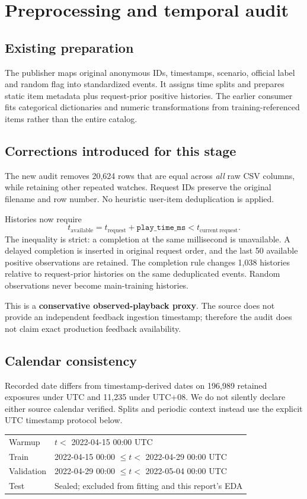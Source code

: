 \documentclass[11pt,a4paper]{article}
\begin{document}
\section{Preprocessing and temporal audit}
\subsection{Existing preparation}
The publisher maps original anonymous IDs, timestamps, scenario, official label and random flag into standardized events. It assigns time splits and prepares static item metadata plus request-prior positive histories. The earlier consumer fits categorical dictionaries and numeric transformations from training-referenced items rather than the entire catalog.

\subsection{Corrections introduced for this stage}
The new audit removes 20,624 rows that are equal across \emph{all} raw CSV columns, while retaining other repeated watches. Request IDs preserve the original filename and row number. No heuristic user-item deduplication is applied.

Histories now require
\[t_{\mathrm{available}}=t_{\mathrm{request}}+\texttt{play\_time\_ms}
<t_{\mathrm{current\ request}}.\]
The inequality is strict: a completion at the same millisecond is unavailable. A delayed completion is inserted in original request order, and the last 50 available positive observations are retained. The completion rule changes 1,038 histories relative to request-prior histories on the same deduplicated events. Random observations never become main-training histories.

This is a \textbf{conservative observed-playback proxy}. The source does not provide an independent feedback ingestion timestamp; therefore the audit does not claim exact production feedback availability.

\subsection{Calendar consistency}
Recorded date differs from timestamp-derived dates on 196,989 retained exposures under UTC and 11,235 under UTC+08. We do not silently declare either source calendar verified. Splits and periodic context instead use the explicit UTC timestamp protocol below.

\begin{center}\begin{tabular}{ll}\toprule
Warmup & $t < $ 2022-04-15 00:00 UTC\\
Train & 2022-04-15 00:00 $\le t <$ 2022-04-29 00:00 UTC\\
Validation & 2022-04-29 00:00 $\le t <$ 2022-05-04 00:00 UTC\\
Test & Sealed; excluded from fitting and this report's EDA\\\bottomrule
\end{tabular}\end{center}
\clearpage
\end{document}
